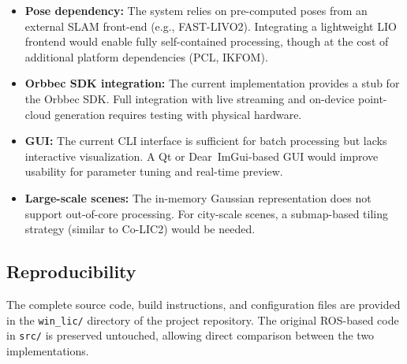 \begin{itemize}
    \item \textbf{Pose dependency:} The system relies on pre-computed
    poses from an external SLAM front-end (e.g., FAST-LIVO2). Integrating
    a lightweight LIO frontend would enable fully self-contained
    processing, though at the cost of additional platform dependencies
    (PCL, IKFOM).

    \item \textbf{Orbbec SDK integration:} The current implementation
    provides a stub for the Orbbec SDK. Full integration with live
    streaming and on-device point-cloud generation requires testing
    with physical hardware.

    \item \textbf{GUI:} The current CLI interface is sufficient for
    batch processing but lacks interactive visualization. A Qt or
    Dear~ImGui-based GUI would improve usability for parameter tuning
    and real-time preview.

    \item \textbf{Large-scale scenes:} The in-memory Gaussian
    representation does not support out-of-core processing. For
    city-scale scenes, a submap-based tiling strategy (similar to
    Co-LIC2) would be needed.
\end{itemize}

\subsection{Reproducibility}

The complete source code, build instructions, and configuration files
are provided in the \texttt{win\_lic/} directory of the project repository.
The original ROS-based code in \texttt{src/} is preserved untouched,
allowing direct comparison between the two implementations.
